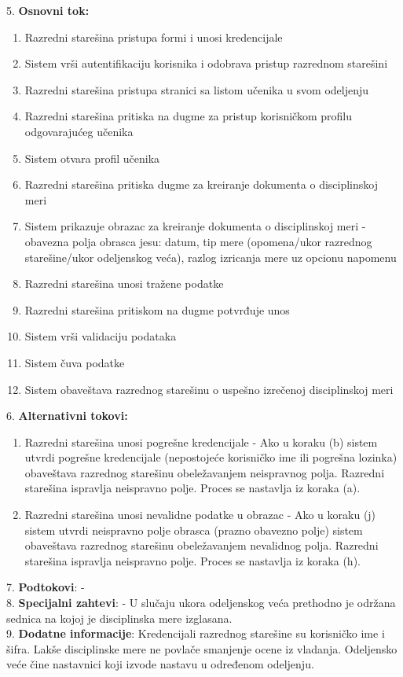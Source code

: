\documentclass{article}
\begin{document}
5. \textbf{Osnovni tok:} 
\begin{enumerate} [label=(\alph*)]
\item Razredni starešina pristupa formi i unosi kredencijale 
\item Sistem vrši autentifikaciju korisnika i odobrava pristup razrednom starešini
\item Razredni starešina pristupa stranici sa listom učenika u svom odeljenju
\item Razredni starešina pritiska na dugme za pristup korisničkom profilu odgovarajućeg učenika
\item Sistem otvara profil učenika
\item Razredni starešina pritiska dugme za kreiranje dokumenta o disciplinskoj meri
\item Sistem prikazuje obrazac za kreiranje dokumenta o disciplinskoj meri - obavezna polja obrasca jesu: datum, tip mere (opomena/ukor razrednog starešine/ukor odeljenskog veća), razlog izricanja mere uz opcionu napomenu
\item Razredni starešina unosi tražene podatke
\item Razredni starešina pritiskom na dugme potvrđuje unos
\item Sistem vrši validaciju podataka
\item Sistem čuva podatke
\item Sistem obaveštava razrednog starešinu o uspešno izrečenoj disciplinskoj meri
\end{enumerate}

6. \textbf{Alternativni tokovi:}
\begin{enumerate} [label=(\roman*)]
\item Razredni starešina unosi pogrešne kredencijale - Ako u koraku (b) sistem utvrdi pogrešne kredencijale (nepostojeće korisničko ime ili pogrešna lozinka) obaveštava razrednog starešinu obeležavanjem neispravnog polja. Razredni starešina ispravlja neispravno polje. Proces se nastavlja iz koraka (a).
\item Razredni starešina unosi nevalidne podatke u obrazac - Ako u koraku (j) sistem utvrdi neispravno polje obrasca (prazno obavezno polje) sistem obaveštava razrednog starešinu obeležavanjem nevalidnog polja. Razredni starešina ispravlja neispravno polje. Proces se nastavlja iz koraka (h).
\end{enumerate}

7. \textbf{Podtokovi}: - \\

8. \textbf{Specijalni zahtevi}: - U slučaju ukora odeljenskog veća prethodno je održana sednica na kojoj je disciplinska mere izglasana. \\

9. \textbf{Dodatne informacije}: Kredencijali razrednog starešine su korisničko ime i šifra. Lakše disciplinske mere ne povlače smanjenje ocene iz vladanja. Odeljensko veće čine nastavnici koji izvode nastavu u određenom odeljenju. \\
\end{document}
